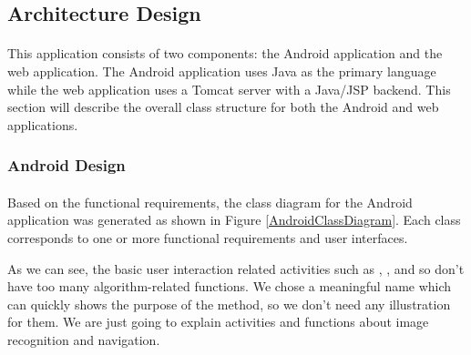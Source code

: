 \subsection{Architecture Design}

\paragraph{}This application consists of two components: the Android application and the web application.  The Android application uses Java as the primary language while the web application uses a Tomcat server with a Java/JSP backend.  This section will describe the overall class structure for both the Android and web applications.

\subsubsection{Android Design}
\paragraph{}Based on the functional requirements, the class diagram for the Android application was generated as shown in Figure \ref{AndroidClassDiagram}. Each class corresponds to one or more functional requirements and user interfaces.
\par As we can see, the basic user interaction related activities such as , ,  and so don't have too many algorithm-related functions. We chose a meaningful name which can quickly shows the purpose of the method, so we don't need any illustration for them. We are just going to explain activities and functions about image recognition and navigation.

